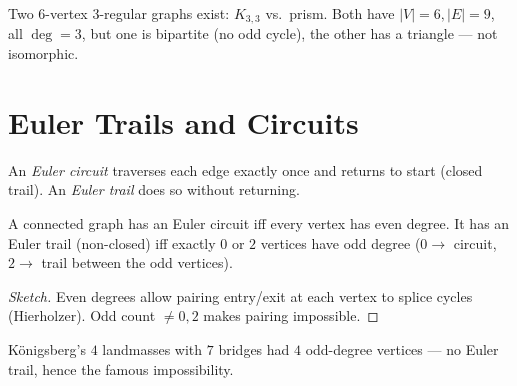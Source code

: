 \begin{example}
Two $6$-vertex $3$-regular graphs exist: $K_{3,3}$ vs.\ prism. Both have $|V|=6,|E|=9$, all $\deg=3$, but one is bipartite (no odd cycle), the other has a triangle --- not isomorphic.
\end{example}

\section{Euler Trails and Circuits}
\label{sec:euler}
An \emph{Euler circuit} traverses each edge exactly once and returns to start (closed trail). An \emph{Euler trail} does so without returning.

\begin{theorem}[Euler, 1736]
A connected graph has an Euler circuit iff every vertex has even degree. It has an Euler trail (non-closed) iff exactly $0$ or $2$ vertices have odd degree ($0\to$ circuit, $2\to$ trail between the odd vertices).
\end{theorem}
\begin{proof}[Sketch] Even degrees allow pairing entry/exit at each vertex to splice cycles (Hierholzer). Odd count $\neq0,2$ makes pairing impossible.
\end{proof}

K\"onigsberg's $4$ landmasses with $7$ bridges had $4$ odd-degree vertices --- no Euler trail, hence the famous impossibility.

